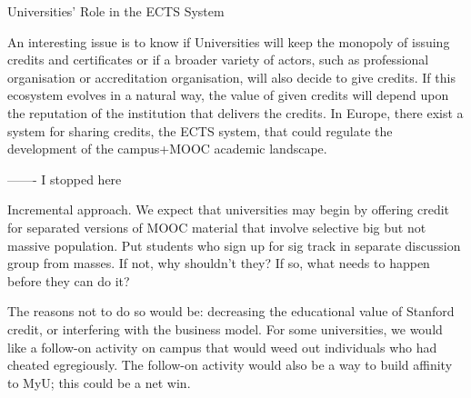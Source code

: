 Universities’ Role in the ECTS System

An interesting issue is to know if Universities will keep the monopoly
of issuing credits and certificates or if a broader variety of actors,
such as professional organisation or accreditation organisation, will
also decide to give credits.  If this ecosystem evolves in a natural
way, the value of given credits will depend upon the reputation of the
institution that delivers the credits. In Europe, there exist a system
for sharing credits, the ECTS system, that could regulate the
development of the campus+MOOC academic landscape.



------- I stopped here
 
Incremental approach. We expect that universities may begin by offering
credit for separated versions of MOOC material that involve selective
big but not massive population. Put students who sign up for sig track
in separate discussion group from masses.  If not, why shouldn't they?
If so, what needs to happen before they can do it?
 
The reasons not to do so would be: decreasing the educational value of
Stanford credit, or interfering with the business model.  For some
universities, we would like a follow-on activity on campus that would
weed out individuals who had cheated egregiously.  The follow-on
activity would also be a way to build affinity to MyU; this could be a
net win.
 


